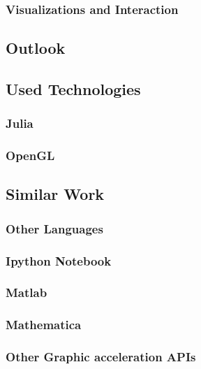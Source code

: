 \subsubsection{Visualizations and Interaction}




\subsection{Outlook}

\subsection{Used Technologies}

\subsubsection{Julia}
\subsubsection{OpenGL}


\subsection{Similar Work}

\subsubsection{Other Languages}
\subsubsection{Ipython Notebook}
\subsubsection{Matlab}
\subsubsection{Mathematica}
\subsubsection{Other Graphic acceleration APIs}